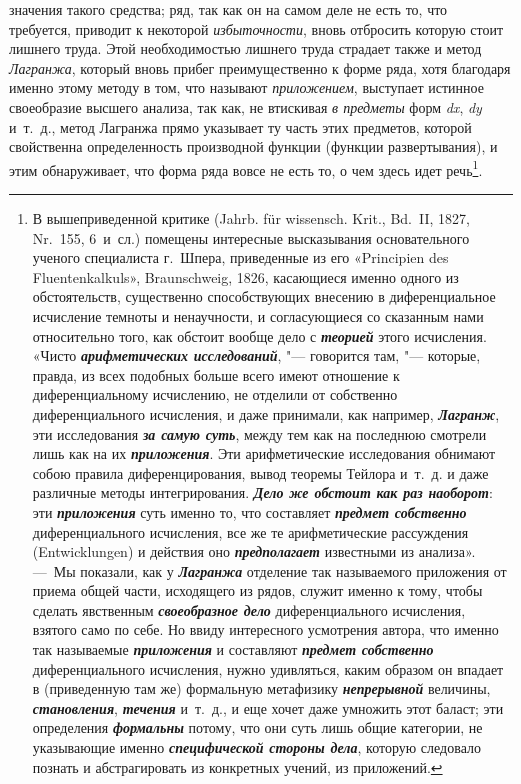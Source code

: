 {значения такого средства; ряд, так как он на самом деле не есть то, что
требуется, приводит к некоторой {\em избыточности},
вновь отбросить которую стоит лишнего труда. Этой необходимостью лишнего
труда страдает также и метод {\em Лагранжа}, который
вновь прибег преимущественно к форме ряда, хотя благодаря именно этому
методу в том, что называют {\em приложением}, выступает
истинное своеобразие высшего анализа, так как, не втискивая
{\em в предметы} форм {\em dx},
{\em dy} и~т.~д., метод Лагранжа прямо указывает ту
часть этих предметов, которой свойственна определенность производной
функции (функции развертывания), и этим обнаруживает, что форма ряда вовсе
не есть то, о чем здесь идет речь\footnote{В вышеприведенной
критике (Jahrb. für wissensch. Krit., Bd.~II, 1827, Nr.~155, 6~и~сл.)
помещены интересные высказывания основательного ученого специалиста
г.~Шпера, приведенные из его «Principien des Fluentenkalkuls», Braunschweig,
1826, касающиеся именно одного из обстоятельств, существенно способствующих
внесению в диференциальное исчисление темноты и ненаучности, и
согласующиеся со сказанным нами относительно того, как обстоит вообще дело
с {\em\bfseries теорией} этого исчисления.
«Чисто {\em\bfseries арифметических исследований},
"--- говорится там, "--- которые, правда, из всех
подобных больше всего имеют отношение к диференциальному исчислению, не
отделили от собственно диференциального исчисления, и даже принимали, как
например, {\em\bfseries Лагранж}, эти
исследования {\em\bfseries за самую суть},
между тем как на последнюю смотрели лишь как на их
{\em\bfseries приложения}. Эти
арифметические исследования обнимают собою правила диференцирования, вывод
теоремы Тейлора и~т.~д. и даже различные методы интегрирования.
{\em\bfseries Дело же обстоит как раз наоборот}: эти {\em\bfseries приложения}
суть именно то, что составляет {\em\bfseries предмет собственно}
диференциального исчисления, все же те арифметические
рассуждения (Entwicklungen) и действия оно
{\em\bfseries предполагает} известными из анализа». ---~Мы показали, как у
{\em\bfseries Лагранжа} отделение так
называемого приложения от приема общей части, исходящего из рядов, служит
именно к тому, чтобы сделать явственным
{\em\bfseries своеобразное дело}
диференциального исчисления, взятого само по себе. Но ввиду
интересного усмотрения автора, что именно так называемые
{\em\bfseries приложения} и составляют
{\em\bfseries предмет собственно}
диференциального исчисления, нужно удивляться, каким образом
он впадает в (приведенную там же) формальную метафизику
{\em\bfseries непрерывной} величины,
{\em\bfseries становления},
{\em\bfseries течения} и~т.~д., и еще хочет
даже умножить этот баласт; эти определения
{\em\bfseries формальны} потому, что они
суть лишь общие категории, не указывающие именно
{\em\bfseries специфической стороны дела},
которую следовало познать и абстрагировать из конкретных
учений, из приложений.}.

}
